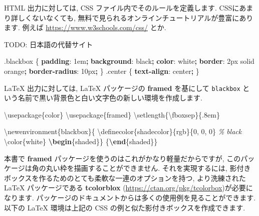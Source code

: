 \documentclass[
  11pt,
]{bxjsreport}
\newenvironment{Shaded}{\begin{snugshade}}{\end{snugshade}}
\newcommand{\BuiltInTok}[1]{#1}
\newcommand{\CommentTok}[1]{\textcolor[rgb]{0.56,0.35,0.01}{\textit{#1}}}
\newcommand{\ConstantTok}[1]{\textcolor[rgb]{0.00,0.00,0.00}{#1}}
\newcommand{\DataTypeTok}[1]{\textcolor[rgb]{0.13,0.29,0.53}{#1}}
\newcommand{\DecValTok}[1]{\textcolor[rgb]{0.00,0.00,0.81}{#1}}
\newcommand{\ExtensionTok}[1]{#1}
\newcommand{\FunctionTok}[1]{\textcolor[rgb]{0.00,0.00,0.00}{#1}}
\newcommand{\KeywordTok}[1]{\textcolor[rgb]{0.13,0.29,0.53}{\textbf{#1}}}
\newcommand{\NormalTok}[1]{#1}
\newcommand{\OperatorTok}[1]{\textcolor[rgb]{0.81,0.36,0.00}{\textbf{#1}}}
\begin{document}
HTML 出力に対しては, CSS ファイル内でそのルールを定義します. CSSにあまり詳しくないなくても, 無料で見られるオンラインチュートリアルが豊富にあります. 例えば \url{https://www.w3schools.com/css/} とか.

TODO: 日本語の代替サイト

\begin{Shaded}
\begin{Highlighting}[numbers=left,,]
\FunctionTok{.blackbox}\NormalTok{ \{}
  \KeywordTok{padding}\NormalTok{: }\DecValTok{1}\DataTypeTok{em}\OperatorTok{;}
  \KeywordTok{background}\NormalTok{: }\ConstantTok{black}\OperatorTok{;}
  \KeywordTok{color}\NormalTok{: }\ConstantTok{white}\OperatorTok{;}
  \KeywordTok{border}\NormalTok{: }\DecValTok{2}\DataTypeTok{px} \DecValTok{solid} \ConstantTok{orange}\OperatorTok{;}
  \KeywordTok{border{-}radius}\NormalTok{: }\DecValTok{10}\DataTypeTok{px}\OperatorTok{;}
\NormalTok{\}}
\FunctionTok{.center}\NormalTok{ \{}
  \KeywordTok{text{-}align}\NormalTok{: }\DecValTok{center}\OperatorTok{;}
\NormalTok{\}}
\end{Highlighting}
\end{Shaded}

LaTeX 出力に対しては, LaTeX パッケージの \textbf{framed} を基にして \texttt{blackbox} という名前で黒い背景色と白い文字色の新しい環境を作成します.

\begin{Shaded}
\begin{Highlighting}[numbers=left,,]
\BuiltInTok{\textbackslash{}usepackage}\NormalTok{\{}\ExtensionTok{color}\NormalTok{\}}
\BuiltInTok{\textbackslash{}usepackage}\NormalTok{\{}\ExtensionTok{framed}\NormalTok{\}}
\FunctionTok{\textbackslash{}setlength}\NormalTok{\{}\FunctionTok{\textbackslash{}fboxsep}\NormalTok{\}\{.8em\}}

\FunctionTok{\textbackslash{}newenvironment}\NormalTok{\{blackbox\}\{}
  \FunctionTok{\textbackslash{}definecolor}\NormalTok{\{shadecolor\}\{rgb\}\{0, 0, 0\}  }\CommentTok{\% black}
  \FunctionTok{\textbackslash{}color}\NormalTok{\{white\}}
  \KeywordTok{\textbackslash{}begin}\NormalTok{\{}\ExtensionTok{shaded}\NormalTok{\}\}}
\NormalTok{ \{}\KeywordTok{\textbackslash{}end}\NormalTok{\{}\ExtensionTok{shaded}\NormalTok{\}\}}
\end{Highlighting}
\end{Shaded}

本書で \textbf{framed} パッケージを使うのはこれがかなり軽量だからですが, このパッケージは角の丸い枠を描画することができません. それを実現するには, 影付きボックスを作るためのとても柔軟な一連のオプションを持つ, より洗練された LaTeX パッケージである \textbf{tcolorblox} (\url{https://ctan.org/pkg/tcolorbox})が必要になります. パッケージのドキュメントからは多くの使用例を見ることができます. 以下の LaTeX 環境は上記の CSS の例と似た影付きボックスを作成できます.
\end{document}
